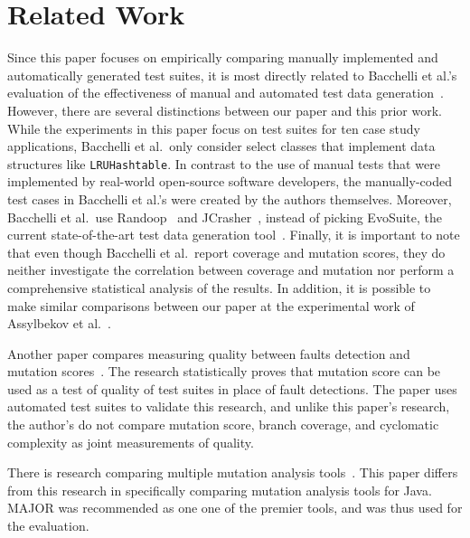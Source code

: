
\section{Related Work} \label{sec:related_work}

Since this paper focuses on empirically comparing manually implemented and automatically generated test suites, it is
most directly related to Bacchelli et al.'s evaluation of the effectiveness of manual and automated test data
generation~\cite{bacchelli2008}. However, there are several distinctions between our paper and this prior work. While
the experiments in this paper focus on test suites for ten case study applications, Bacchelli et al.\ only consider
select classes that implement data structures like {\tt LRUHashtable}. In contrast to the use of manual tests that were
implemented by real-world open-source software developers, the manually-coded test cases in Bacchelli et al.'s were
created by the authors themselves.  Moreover, Bacchelli et al.\ use Randoop~\cite{pacheco2007feedback} and
JCrasher~\cite{csallner2004}, instead of picking EvoSuite, the current state-of-the-art test data generation
tool~\cite{fraser2013a}. Finally, it is important to note that even though Bacchelli et al.\ report coverage and
mutation scores, they do neither investigate the correlation between coverage and mutation nor perform a comprehensive
statistical analysis of the results. In addition, it is possible to make similar comparisons between our paper at the
experimental work of Assylbekov et al.~\cite{assylbekov2013}.





Another paper compares measuring quality between faults detection and mutation scores~\cite{just2014}. The research statistically proves that mutation score can be used as a test of quality of test suites in place of fault detections.  The paper uses automated test suites to validate this research, and unlike this paper's research, the author's do not compare mutation score, branch coverage, and cyclomatic complexity as joint measurements of quality. 

There is research comparing multiple mutation analysis tools~\cite{ComparingAutomatedMutationTools:2013}. This paper differs from this research in specifically comparing mutation analysis tools for Java. MAJOR was recommended as one one of the premier tools, and was thus used for the evaluation.
